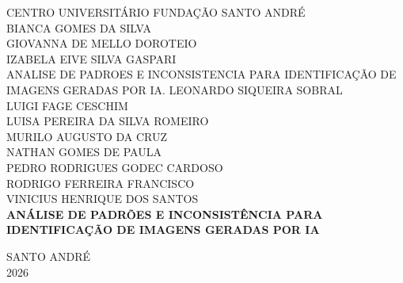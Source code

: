 \begin{titlepage}
\begin{center}
\MakeUppercase{Centro Universitário Fundação Santo André}\\[2.5cm]

BIANCA GOMES DA SILVA\\
GIOVANNA DE MELLO DOROTEIO\\
IZABELA EIVE SILVA GASPARI\\ANALISE DE PADROES E INCONSISTENCIA PARA IDENTIFICAÇÃO DE IMAGENS GERADAS POR IA.
LEONARDO SIQUEIRA SOBRAL\\
LUIGI FAGE CESCHIM\\
LUISA PEREIRA DA SILVA ROMEIRO\\
MURILO AUGUSTO DA CRUZ\\
NATHAN GOMES DE PAULA\\
PEDRO RODRIGUES GODEC CARDOSO\\
RODRIGO FERREIRA FRANCISCO\\
VINICIUS HENRIQUE DOS SANTOS\\[3.5cm]

\textbf{\MakeUppercase{Análise de padrões e inconsistência para identificação
de imagens geradas por IA}}

\vfill
SANTO ANDRÉ\\
2026
\end{center}
\end{titlepage}

